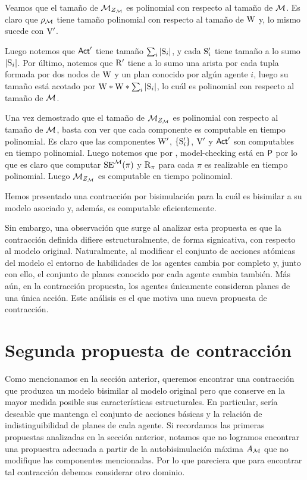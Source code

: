 \begin{demostracion}
    Veamos que el tamaño de $\fcont{\model}$ es polinomial con respecto al tamaño de $\model$. Es claro que $\rho_\model$ tiene tamaño 
    polinomial con respecto al tamaño de $\W$ y, lo mismo sucede con $\V'$. 

    Luego notemos que $\ACT'$ tiene tamaño $\sum_{i} |\S_i|$, y cada $\S_i'$ tiene tamaño a lo sumo $|\S_i|$. Por último, notemos que 
    $\R'$ tiene a lo sumo una arista por cada tupla formada por dos nodos de $\W$ y un plan conocido por algún agente $i$, luego su 
    tamaño está acotado por $\W * \W * \sum_{i}|\S_i|$, lo cuál es polinomial con respecto al tamaño de $\model$.

    Una vez demostrado que el tamaño de $\fcont{\model}$ es polinomial con respecto al tamaño de $\model$, basta con ver que cada componente 
    es computable en tiempo polinomial. Es claro que las componentes $\W'$, $\{\S_i'\}$, $\V'$ y $\ACT'$ son computables en tiempo 
    polinomial. Luego notemos que por , model-checking está en $\Poly$ por lo que es claro que computar 
    $\sexec^{\model}(\pi)$ y $\R_\pi$ para cada $\pi$ es realizable en tiempo polinomial. Luego $\fcont{\model}$ es computable en tiempo polinomial.
\end{demostracion}

Hemos presentado una contracción por bisimulación para \KHilogic la cuál es bisimilar a su modelo asociado y, además, 
es computable eficientemente.

Sin embargo, una observación que surge al analizar esta propuesta es que la contracción definida difiere estructuralmente, de 
forma signicativa, con respecto al modelo original. 
Naturalmente, al modificar el conjunto de acciones atómicas del modelo el entorno de habilidades de los agentes cambia por completo y, 
junto con ello, el conjunto de planes conocido por cada agente cambia también. Más aún, en la contracción propuesta, los agentes 
únicamente consideran planes de una única acción. Este análisis es el que motiva una nueva propuesta de contracción.

\section{Segunda propuesta de contracción}

Como mencionamos en la sección anterior, queremos encontrar una contracción que produzca un modelo bisimilar al modelo original pero que conserve 
en la mayor medida posible sus características estructurales. En particular, sería deseable que mantenga el conjunto de acciones básicas y la relación de 
indistinguibilidad de planes de cada agente. Si recordamos las primeras propuestas analizadas en la sección anterior, notamos que no 
logramos encontrar una propuestra adecuada a partir de la autobisimulación máxima $A_\model$ que no modifique las componentes 
mencionadas. Por lo que pareciera que para encontrar tal contracción debemos considerar otro dominio.  

